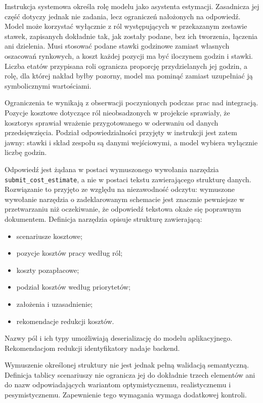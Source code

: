 Instrukcja systemowa określa rolę modelu jako asystenta estymacji. Zasadnicza jej część dotyczy jednak nie zadania, lecz ograniczeń nałożonych na odpowiedź. Model może korzystać wyłącznie z ról występujących w przekazanym zestawie stawek, zapisanych dokładnie tak, jak zostały podane, bez ich tworzenia, łączenia ani dzielenia. Musi stosować podane stawki godzinowe zamiast własnych oszacowań rynkowych, a koszt każdej pozycji ma być iloczynem godzin i stawki. Liczba etatów przypisana roli ogranicza proporcję przydzielanych jej godzin, a rolę, dla której nakład byłby pozorny, model ma pominąć zamiast uzupełniać ją symbolicznymi wartościami.

Ograniczenia te wynikają z obserwacji poczynionych podczas prac nad integracją. Pozycje kosztowe dotyczące ról nieobsadzonych w projekcie sprawiały, że kosztorys sprawiał wrażenie przygotowanego w oderwaniu od danych przedsięwzięcia. Podział odpowiedzialności przyjęty w instrukcji jest zatem jawny: stawki i skład zespołu są danymi wejściowymi, a model wybiera wyłącznie liczbę godzin.

Odpowiedź jest żądana w postaci wymuszonego wywołania narzędzia \texttt{submit\_cost\_estimate}, a nie w postaci tekstu zawierającego strukturę danych. Rozwiązanie to przyjęto ze względu na niezawodność odczytu: wymuszone wywołanie narzędzia o zadeklarowanym schemacie jest znacznie pewniejsze w przetwarzaniu niż oczekiwanie, że odpowiedź tekstowa okaże się poprawnym dokumentem. Definicja narzędzia opisuje strukturę zawierającą:

\begin{itemize}
    \item scenariusze kosztowe;
    \item pozycje kosztów pracy według ról;
    \item koszty pozapłacowe;
    \item podział kosztów według priorytetów;
    \item założenia i uzasadnienie;
    \item rekomendacje redukcji kosztów.
\end{itemize}

Nazwy pól i ich typy umożliwiają deserializację do modelu aplikacyjnego. Rekomendacjom redukcji identyfikatory nadaje backend.

Wymuszenie określonej struktury nie jest jednak pełną walidacją semantyczną. Definicja tablicy scenariuszy nie ogranicza jej do dokładnie trzech elementów ani do nazw odpowiadających wariantom optymistycznemu, realistycznemu i pesymistycznemu. Zapewnienie tego wymagania wymaga dodatkowej kontroli.

